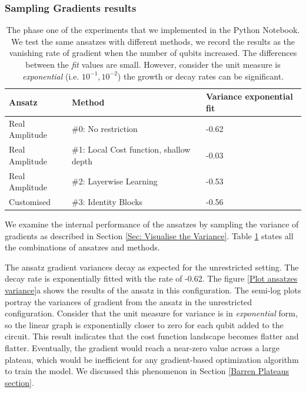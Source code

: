 
\subsubsection{Sampling Gradients results} \label{Sec: Sampling Gradients results}
\begin{table}
    \centering
    \begin{tabular}{|| l l l ||}
        \hline
        \textbf{Ansatz} & \textbf{Method}                         & \textbf{Variance exponential fit} \\[0.5ex]
        \hline \hline
        Real Amplitude  & \#0: No restriction                     & -0.62                             \\
        Real Amplitude  & \#1: Local Cost function, shallow depth & -0.03                             \\
        Real Amplitude  & \#2: Layerwise Learning                 & -0.53                             \\
        Customised      & \#3: Identity Blocks                    & -0.56                             \\
        \hline
    \end{tabular}
    \caption{
        The phase one of the experiments that we implemented in the Python Notebook.
        We test the same ansatzes with different methods, we record the results as the vanishing rate of gradient when the number of qubits increased.
        The differences between the \emph{fit} values are small.
        However, consider the unit measure is \emph{exponential} (i.e. $10^{-1}, 10^{-2}$) the growth or decay rates can be significant.
    }
    \label{Tab: Experiment Phase 1 Res}
\end{table}

We examine the internal performance of the ansatzes by sampling the variance of gradients as described in Section \ref{Sec: Visualise the Variance}.
Table \ref{Tab: Experiment Phase 1 Res} states all the combinations of ansatzes and methods.

The ansatz gradient variances decay as expected for the unrestricted setting.
The decay rate is exponentially fitted with the rate of -0.62.
The figure \ref{Plot ansatzes variance}a shows the results of the ansatz in this configuration.
The semi-log plots portray the variances of gradient from the ansatz in the unrestricted configuration.
Consider that the unit measure for variance is in \emph{exponential} form, so the linear graph is exponentially closer to zero for each qubit added to the circuit.
This result indicates that the cost function landscape becomes flatter and flatter.
Eventually, the gradient would reach a near-zero value across a large plateau, which would be inefficient for any gradient-based optimization algorithm to train the model.
We discussed this phenomenon in Section \ref{Barren Plateaus section}.


